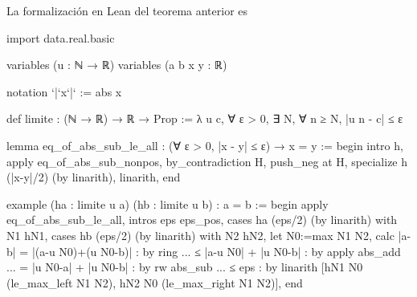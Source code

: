 La formalización en Lean del teorema anterior es
\begin{leancode}
import data.real.basic

variables (u : ℕ → ℝ)
variables (a b x y : ℝ)

notation `|`x`|` := abs x

def limite : (ℕ → ℝ) → ℝ → Prop :=
λ u c, ∀ ε > 0, ∃ N, ∀ n ≥ N, |u n - c| ≤ ε

lemma eq_of_abs_sub_le_all
  : (∀ ε > 0, |x - y| ≤ ε) → x = y :=
begin
  intro h,
  apply eq_of_abs_sub_nonpos,
  by_contradiction H,
  push_neg at H,
  specialize h (|x-y|/2) (by linarith),
  linarith,
end

example
  (ha : limite u a)
  (hb : limite u b)
  : a = b :=
begin
  apply eq_of_abs_sub_le_all,
  intros eps eps_pos,
  cases ha (eps/2) (by linarith) with N1 hN1,
  cases hb (eps/2) (by linarith) with N2 hN2,
  let N0:=max N1 N2,
  calc  |a-b|
      = |(a-u N0)+(u N0-b)| : by ring
  ... ≤ |a-u N0| + |u N0-b| : by apply abs_add
  ... = |u N0-a| + |u N0-b| : by rw abs_sub
  ... ≤ eps                 : by linarith [hN1 N0 (le_max_left N1 N2),
                                           hN2 N0 (le_max_right N1 N2)],
end
\end{leancode}

